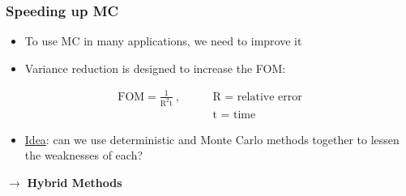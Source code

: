 \documentclass[xcolor=x11names,compress]{beamer}
\renewcommand{\(}{\begin{columns}}
\renewcommand{\)}{\end{columns}}
\newcommand{\<}[1]{\begin{column}{#1}}
\renewcommand{\>}{\end{column}}
\begin{document}
\begin{frame}[fragile]
  \frametitle{Speeding up MC}
  \begin{itemize}
  	\item To use MC in many applications, we need to \alert{improve} it
	\item Variance reduction is designed to increase the FOM:
  \end{itemize}
\begin{align}
\text{FOM} = \frac{1}{\text{R}^2\text{t}}\:,
 \qquad & \text{R = relative error} \nonumber \\ 
& \text{t = time} \nonumber 
\end{align}
  \begin{itemize}
  \pause
  	\item \underline{Idea}: can we use deterministic and Monte Carlo methods together to lessen the weaknesses of each?
  \end{itemize}
  \pause
  $\rightarrow$ \textbf{Hybrid Methods}

\end{frame}
\end{document}
